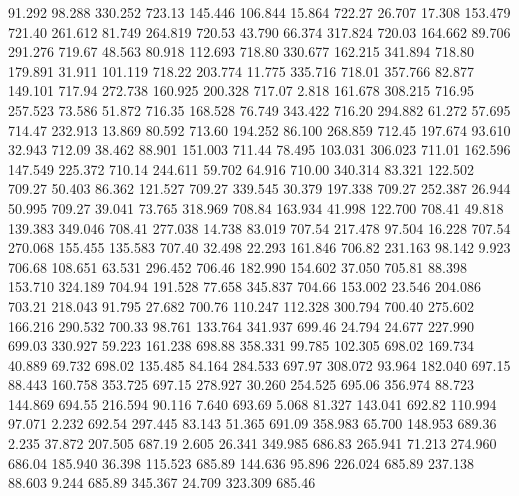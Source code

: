   91.292   98.288  330.252       723.13
 145.446  106.844   15.864       722.27
  26.707   17.308  153.479       721.40
 261.612   81.749  264.819       720.53
  43.790   66.374  317.824       720.03
 164.662   89.706  291.276       719.67
  48.563   80.918  112.693       718.80
 330.677  162.215  341.894       718.80
 179.891   31.911  101.119       718.22
 203.774   11.775  335.716       718.01
 357.766   82.877  149.101       717.94
 272.738  160.925  200.328       717.07
   2.818  161.678  308.215       716.95
 257.523   73.586   51.872       716.35
 168.528   76.749  343.422       716.20
 294.882   61.272   57.695       714.47
 232.913   13.869   80.592       713.60
 194.252   86.100  268.859       712.45
 197.674   93.610   32.943       712.09
  38.462   88.901  151.003       711.44
  78.495  103.031  306.023       711.01
 162.596  147.549  225.372       710.14
 244.611   59.702   64.916       710.00
 340.314   83.321  122.502       709.27
  50.403   86.362  121.527       709.27
 339.545   30.379  197.338       709.27
 252.387   26.944   50.995       709.27
  39.041   73.765  318.969       708.84
 163.934   41.998  122.700       708.41
  49.818  139.383  349.046       708.41
 277.038   14.738   83.019       707.54
 217.478   97.504   16.228       707.54
 270.068  155.455  135.583       707.40
  32.498   22.293  161.846       706.82
 231.163   98.142    9.923       706.68
 108.651   63.531  296.452       706.46
 182.990  154.602   37.050       705.81
  88.398  153.710  324.189       704.94
 191.528   77.658  345.837       704.66
 153.002   23.546  204.086       703.21
 218.043   91.795   27.682       700.76
 110.247  112.328  300.794       700.40
 275.602  166.216  290.532       700.33
  98.761  133.764  341.937       699.46
  24.794   24.677  227.990       699.03
 330.927   59.223  161.238       698.88
 358.331   99.785  102.305       698.02
 169.734   40.889   69.732       698.02
 135.485   84.164  284.533       697.97
 308.072   93.964  182.040       697.15
  88.443  160.758  353.725       697.15
 278.927   30.260  254.525       695.06
 356.974   88.723  144.869       694.55
 216.594   90.116    7.640       693.69
   5.068   81.327  143.041       692.82
 110.994   97.071    2.232       692.54
 297.445   83.143   51.365       691.09
 358.983   65.700  148.953       689.36
   2.235   37.872  207.505       687.19
   2.605   26.341  349.985       686.83
 265.941   71.213  274.960       686.04
 185.940   36.398  115.523       685.89
 144.636   95.896  226.024       685.89
 237.138   88.603    9.244       685.89
 345.367   24.709  323.309       685.46
